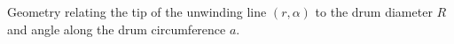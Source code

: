 \label{fig:geometry} Geometry relating the tip of the unwinding line $(r,\alpha)$ to the drum diameter $R$ and angle along the drum circumference $a$.